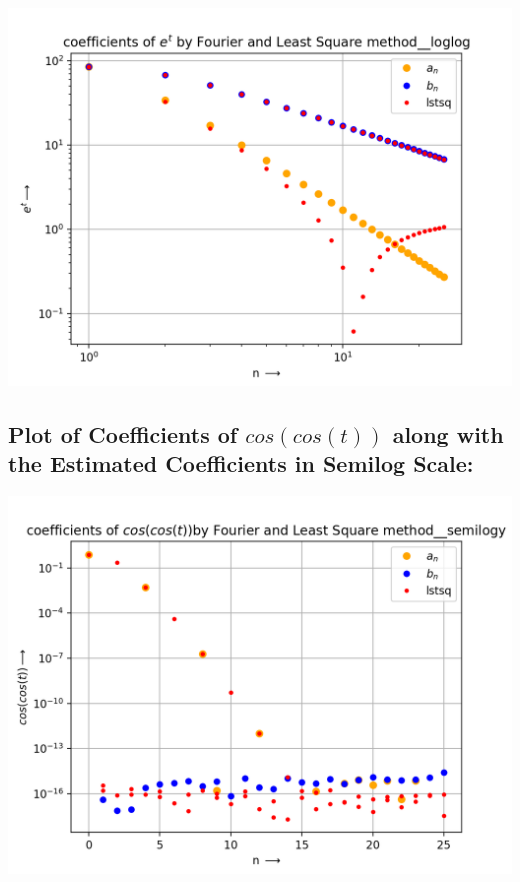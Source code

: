 \documentclass[10pt,english, openany]{book}
\begin{document}
{\centering\includegraphics[scale=0.7]{Figure_4.png}}

\subsection{Plot of Coefficients of $cos(cos(t))$ along with the Estimated Coefficients  in Semilog Scale:}
{\centering\includegraphics[scale=0.7]{Figure_5.png}}
\end{document}
